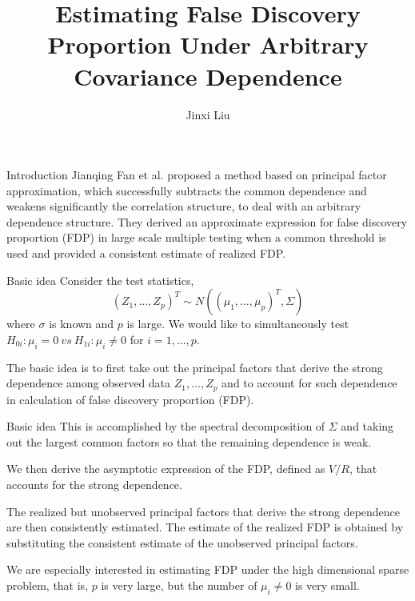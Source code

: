 \documentclass{beamer}
\title{Estimating False Discovery Proportion Under Arbitrary Covariance Dependence}
\author{Jinxi Liu}
\begin{document}
	
\begin{frame}
	
	\titlepage
	
\end{frame}

\begin{frame}[t]{Introduction}\vspace{10pt}
Jianqing Fan et al. proposed a method based on principal factor approximation, which successfully subtracts the common dependence and weakens significantly the correlation structure, to deal with an arbitrary dependence structure. They derived an approximate expression for false discovery proportion (FDP) in large scale multiple testing when a common threshold is used and provided a consistent estimate of realized FDP.
\end{frame}

\begin{frame}[t]{Basic idea}\vspace{10pt}
Consider the test statistics,
$$ (Z_1,...,Z_p)^T \sim N((\mu_1,...,\mu_p)^T, \Sigma)$$
where $\sigma$ is known and $p$ is large. We would like to simultaneously test $H_{0i}:\mu_i=0 \ vs\  H_{1i}:\mu_i\neq0$ for $i=1,...,p$.

The basic idea is to first take out the principal factors that derive the strong dependence among observed data $Z_1,...,Z_p$ and to account for such dependence in calculation of false discovery proportion (FDP). 
\end{frame}


\begin{frame}[t]{Basic idea}\vspace{10pt}
This is accomplished by the spectral decomposition of $\Sigma$ and taking out the largest common factors so that the remaining dependence is weak. 

We then derive the asymptotic expression of the FDP, defined as $V/R$, that accounts for the strong dependence. 

The realized but unobserved principal factors that derive the strong dependence are then consistently estimated. The estimate of the realized FDP is obtained by substituting the consistent estimate of the unobserved principal factors.

We are especially interested in estimating FDP under the high dimensional sparse problem, that is, $p$ is very large, but the number of $\mu_i \neq 0$ is very small.

\end{frame}
\end{document}
